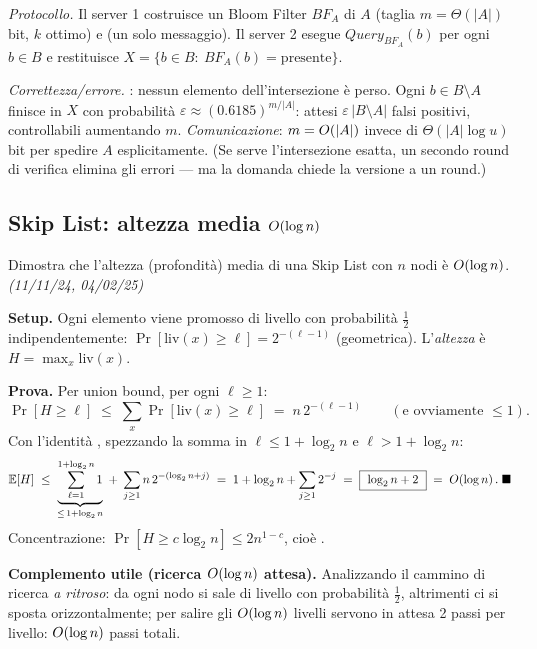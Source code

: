 \emph{Protocollo.} Il server 1 costruisce un Bloom Filter $BF_A$ di $A$ (taglia $m=\Theta(|A|)$
bit, $k$ ottimo) e  (un solo messaggio). Il server 2 esegue
$\textit{Query}_{BF_A}(b)$ per ogni $b\in B$ e restituisce
$X=\{b\in B:\ BF_A(b)=\text{presente}\}$.

\emph{Correttezza/errore.} : nessun
elemento dell'intersezione \`e perso. Ogni $b\in B\setminus A$ finisce in $X$ con probabilit\`a
$\varepsilon\approx(0.6185)^{m/|A|}$: attesi $\varepsilon\,|B\setminus A|$ falsi positivi,
controllabili aumentando $m$. \emph{Comunicazione}: $m=O\!\left(|A|\right)$  invece di
$\Theta(|A|\log u)$ bit per spedire $A$ esplicitamente. (Se serve l'intersezione esatta, un
secondo round di verifica elimina gli errori --- ma la domanda chiede la versione a un round.)

\subsection*{ Skip List: altezza media $O\!\left(\log n\right)$}

\begin{domanda}
Dimostra che l'altezza (profondit\`a) media di una Skip List con $n$ nodi \`e $O\!\left(\log n\right)$.
\emph{(11/11/24, 04/02/25)}
\end{domanda}

\textbf{Setup.} Ogni elemento viene promosso di livello con probabilit\`a $\tfrac12$
indipendentemente: $\Pr[\text{liv}(x)\ge\ell]=2^{-(\ell-1)}$ (geometrica). L'\emph{altezza} \`e
$H=\max_x \text{liv}(x)$.

\textbf{Prova.} Per union bound, per ogni $\ell\ge1$:
\[
\Pr[H\ge\ell]\;\le\;\sum_{x}\Pr[\text{liv}(x)\ge\ell]\;=\;n\,2^{-(\ell-1)}
\qquad(\text{e ovviamente }\le1).
\]
Con l'identit\`a , spezzando la somma in
$\ell\le1+\log_2 n$ e $\ell>1+\log_2 n$:
\[
\mathbb{E}[H]\;\le\;\underbrace{\sum_{\ell=1}^{1+\log_2 n}1}_{\le\,1+\log_2 n}
\;+\;\sum_{j\ge1} n\,2^{-(\log_2 n+j)}
\;=\;1+\log_2 n+\sum_{j\ge1}2^{-j}
\;=\;\boxed{\ \log_2 n+2\ }\;=\;O\!\left(\log n\right). \;\blacksquare
\]
Concentrazione: $\Pr[H\ge c\log_2 n]\le 2n^{1-c}$, cio\`e .

\textbf{Complemento utile (ricerca $O\!\left(\log n\right)$ attesa).} Analizzando il cammino di ricerca
\emph{a ritroso}: da ogni nodo si sale di livello con probabilit\`a $\tfrac12$, altrimenti ci si
sposta orizzontalmente; per salire gli $O\!\left(\log n\right)$ livelli servono in attesa 2 passi per
livello: $O\!\left(\log n\right)$ passi totali.

